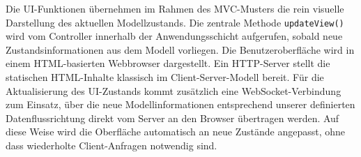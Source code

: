 Die UI-Funktionen übernehmen im Rahmen des MVC-Musters die rein visuelle Darstellung des aktuellen Modellzustands. 
Die zentrale Methode \texttt{updateView()} wird vom Controller innerhalb der Anwendungsschicht aufgerufen, sobald neue Zustandsinformationen aus dem Modell vorliegen. 
Die Benutzeroberfläche wird in einem HTML-basierten Webbrowser dargestellt. 
Ein HTTP-Server stellt die statischen HTML-Inhalte klassisch im Client-Server-Modell bereit. 
Für die Aktualisierung des UI-Zustands kommt zusätzlich eine WebSocket-Verbindung zum Einsatz, über die neue Modellinformationen entsprechend unserer definierten Datenflussrichtung direkt vom Server an den Browser übertragen werden. 
Auf diese Weise wird die Oberfläche automatisch an neue Zustände angepasst, ohne dass wiederholte Client-Anfragen notwendig sind.


